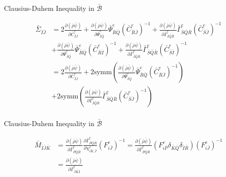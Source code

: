 \documentclass[11pt]{beamer}
\begin{document}
\begin{frame}{Clausius-Duhem Inequality in $\bar{\mathcal{B}}$}

\begin{align*}
\bar{\Sigma}_{\bar{I}\bar{J}} &= 2\frac{\partial\left(\bar{\rho}\bar{\psi}\right)}{\partial \bar{C}_{\bar{I}\bar{J}}^e} + \frac{\partial\left(\bar{\rho}\bar{\psi}\right)}{\partial \bar{\Psi}_{\bar{I}\bar{Q}}^e}\bar{\Psi}_{\bar{R}\bar{Q}}^e \left(\bar{C}_{\bar{R}\bar{J}}^e\right)^{-1} + \frac{\partial\left(\bar{\rho}\bar{\psi}\right)}{\partial \bar{\Gamma}_{\bar{I}\bar{Q}\bar{R}}^e} \bar{\Gamma}_{\bar{S}\bar{Q}\bar{R}}^e \left(\bar{C}_{\bar{S}\bar{J}}^e\right)^{-1}\\
&+ \frac{ \partial \left(\bar{\rho}\bar{\psi}\right)}{\partial \bar{\Psi}_{\bar{J}\bar{Q}}^e} \bar{\Psi}_{\bar{R}\bar{Q}}^e \left(\bar{C}_{\bar{R}\bar{I}}^e\right)^{-1}  + \frac{\partial \left(\bar{\rho}\bar{\psi}\right)}{\partial \bar{\Gamma}_{\bar{J}\bar{Q}\bar{R}}^e} \bar{\Gamma}_{\bar{S}\bar{Q}\bar{R}}^e  \left(\bar{C}_{\bar{S} \bar{I}}^e\right)^{-1}\\
&= 2\frac{\partial\left(\bar{\rho}\bar{\psi}\right)}{\partial \bar{C}_{\bar{I}\bar{J}}^e} + 2\text{symm}\left( \frac{\partial\left(\bar{\rho}\bar{\psi}\right)}{\partial \bar{\Psi}_{\bar{I}\bar{Q}}^e}\bar{\Psi}_{\bar{R}\bar{Q}}^e \left(\bar{C}_{\bar{R}\bar{J}}^e\right)^{-1}\right)\\
& + 2\text{symm}\left(\frac{\partial\left(\bar{\rho}\bar{\psi}\right)}{\partial \bar{\Gamma}_{\bar{I}\bar{Q}\bar{R}}^e} \bar{\Gamma}_{\bar{S}\bar{Q}\bar{R}}^e \left(\bar{C}_{\bar{S}\bar{J}}^e\right)^{-1}\right)\\
\end{align*}

\end{frame}

\begin{frame}{Clausius-Duhem Inequality in $\bar{\mathcal{B}}$}

\begin{align*}
\bar{M}_{\bar{I}\bar{J}\bar{K}}&= \frac{\partial \left(\bar{\rho}\bar{\psi}\right)}{\partial \bar{\Gamma}_{\bar{P}\bar{Q}\bar{R}}^e} \frac{\partial \bar{\Gamma}_{\bar{P}\bar{Q}\bar{R}}^e}{\partial \chi_{i\bar{K},\bar{I}}^e}\left(F_{i\bar{J}}^e\right)^{-1} = \frac{\partial \left(\bar{\rho}\bar{\psi}\right)}{\partial \bar{\Gamma}_{\bar{P}\bar{Q}\bar{R}}^e} \left( F_{i\bar{P}}^e \delta_{\bar{K}\bar{Q}}\delta_{\bar{I}\bar{R}}\right) \left(F_{i\bar{J}}^e\right)^{-1}\\
&= \frac{\partial \left(\bar{\rho}\bar{\psi}\right)}{\partial \bar{\Gamma}_{\bar{J}\bar{K}\bar{I}}^e}\\
\end{align*}

\end{frame}
\end{document}
